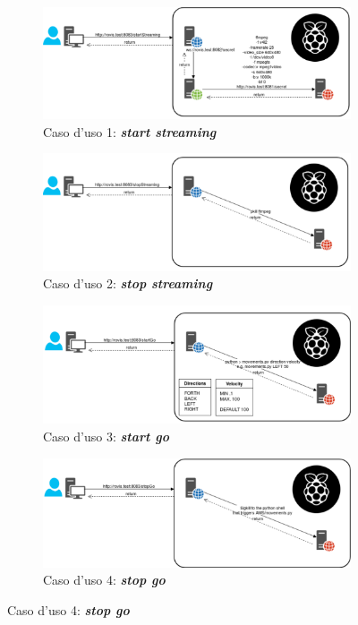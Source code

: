 \documentclass[11pt]{article}
\begin{document}
\begin{figure}[h!]
	\centering
	\begin{subfigure}[b]{0.4\textwidth}
		\includegraphics[width=\textwidth]{images/api1.png}
		\caption{Caso d'uso 1: \textbf{\textit{start streaming}}}
		\label{fig:usecase1}
	\end{subfigure}
	\begin{subfigure}[b]{0.4\textwidth}	
		\includegraphics[width=\textwidth]{images/api2.png}
		\caption{Caso d'uso 2: \textbf{\textit{stop streaming}}}
		\label{fig:usecase2}
	\end{subfigure}
	\begin{subfigure}[b]{0.4\textwidth}
		\includegraphics[width=\textwidth]{images/api3.png}
		\caption{Caso d'uso 3: \textbf{\textit{start go}}}
		\label{fig:usecase3}
	\end{subfigure}
	\begin{subfigure}[b]{0.4\textwidth}
		\includegraphics[width=\textwidth]{images/api4.png}
		\caption{Caso d'uso 4: \textbf{\textit{stop go}}}
		\label{fig:usecase4}
	\end{subfigure}
\end{figure}
\end{document}
